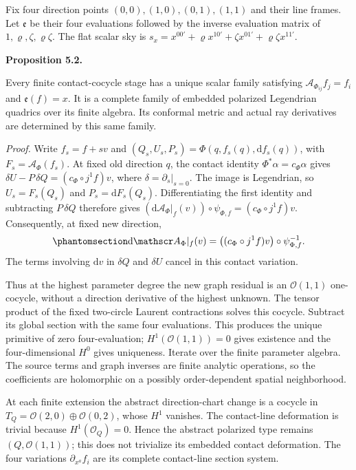 \documentclass[
  english,
  11pt,
  reqno]{amsart}
\makeatletter
\newcommand{\pandocstatementheading}[1]{%
  \par\addpenalty{\@beginparpenalty}%
  \addvspace{.5\baselineskip plus .2\baselineskip minus .2\baselineskip}%
  {\normalfont\bfseries #1\par}%
  \nobreak\@afterindenttrue\@afterheading
}
\makeatother
\begin{document}
Fix four direction points \((0,0),(1,0),(0,1),(1,1)\) and their line
frames. Let \(\mathfrak e\) be their four evaluations followed by the
inverse evaluation matrix of \(1,\varrho,\zeta,\varrho\zeta\). The flat
scalar sky is
\(s_x=x^{00'}+\varrho x^{10'}+\zeta x^{01'}+\varrho\zeta x^{11'}\).

\pandocstatementheading{\protect{}\label{prop:gg-finite-incidence}Proposition 5.2.}

Every finite contact-cocycle stage has a unique scalar family satisfying
\(\mathscr A_{\Phi_{ij}}f_j=f_i\) and \(\mathfrak e(f)=x\). It is a
complete family of embedded polarized Legendrian quadrics over its
finite algebra. Its conformal metric and actual ray derivatives are
determined by this same family.

\emph{Proof.} Write \(f_s=f+sv\) and
\((Q_s,U_s,P_s)=\Phi(q,f_s(q),\mathrm df_s(q))\), with
\(F_s=\mathscr A_\Phi(f_s)\). At fixed old direction \(q\), the contact
identity \(\Phi^*\alpha=c_\Phi\alpha\) gives
\(\delta U-P\,\delta Q=(c_\Phi\circ j^1f)v\), where
\(\delta=\partial_s|_{s=0}\). The image is Legendrian, so
\(U_s=F_s(Q_s)\) and \(P_s=\mathrm dF_s(Q_s)\). Differentiating the
first identity and subtracting \(P\,\delta Q\) therefore gives
\((\mathrm d\mathscr A_\Phi|_f(v))\circ\psi_{\Phi,f}
=(c_\Phi\circ j^1f)v\). Consequently, at fixed new direction,
\begin{equation}\protect\phantomsection\label{eq:gg-graph-linearization}{
 \mathrm d\mathscr A_\Phi|_f(v)
       =\bigl((c_\Phi\circ j^1f)v\bigr)
                         \circ\psi_{\Phi,f}^{-1}.
}\end{equation} The terms involving \(\mathrm dv\) in \(\delta Q\) and
\(\delta U\) cancel in this contact variation.

Thus at the highest parameter degree the new graph residual is an
\(\mathcal O(1,1)\) one-cocycle, without a direction derivative of the
highest unknown. The tensor product of the fixed two-circle Laurent
contractions solves this cocycle. Subtract its global section with the
same four evaluations. This produces the unique primitive of zero
four-evaluation; \(H^1(\mathcal O(1,1))=0\) gives existence and the
four-dimensional \(H^0\) gives uniqueness. Iterate over the finite
parameter algebra. The source terms and graph inverses are finite
analytic operations, so the coefficients are holomorphic on a possibly
order-dependent spatial neighborhood.

At each finite extension the abstract direction-chart change is a
cocycle in \(T_Q=\mathcal O(2,0)\oplus\mathcal O(0,2)\), whose \(H^1\)
vanishes. The contact-line deformation is trivial because
\(H^1(\mathcal O_Q)=0\). Hence the abstract polarized type remains
\((Q,\mathcal O(1,1))\); this does not trivialize its embedded contact
deformation. The four variations \(\partial_{x^a}f_i\) are its complete
contact-line section system.
\end{document}
